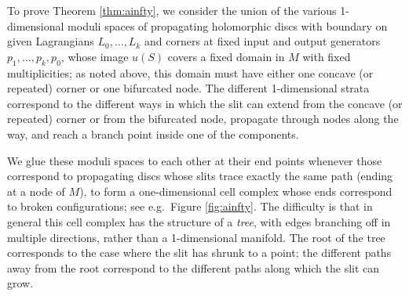 \documentclass[11pt,leqno]{amsart}
\newtheorem{prop}[theo]{Proposition}
\numberwithin{equation}{section}
\begin{document}
To prove Theorem \ref{thm:ainfty}, we consider the union of the various
1-dimensional moduli spaces of propagating holomorphic discs with boundary on given Lagrangians
$L_0,\dots,L_k$ and corners at fixed input and output generators
$p_1,\dots,p_k,p_0$, whose image $u(S)$ covers a fixed domain in $M$ with fixed
multiplicities; as noted above, this domain must have either one concave (or
repeated) corner or one bifurcated node.
The different 1-dimensional strata correspond to the different ways
in which the slit can extend from the concave (or repeated) corner or from
the bifurcated node, propagate through
nodes along the way, and reach a branch point inside one of the components.

We glue these moduli spaces to each other at their end points whenever those
correspond to propagating discs whose slits trace exactly the same path (ending 
at a node of $M$), to form a one-dimensional cell complex whose ends
correspond to broken configurations; 
see e.g.\ Figure \ref{fig:ainfty}. The difficulty is that in general this cell complex 
has the structure of a {\em tree}, with edges branching off in multiple
directions, rather than a 1-dimensional manifold.
The root of the tree corresponds to the case where the slit has shrunk to a
point; the different paths away from the root correspond to the different
paths along which the slit can grow.


%
\end{document}
